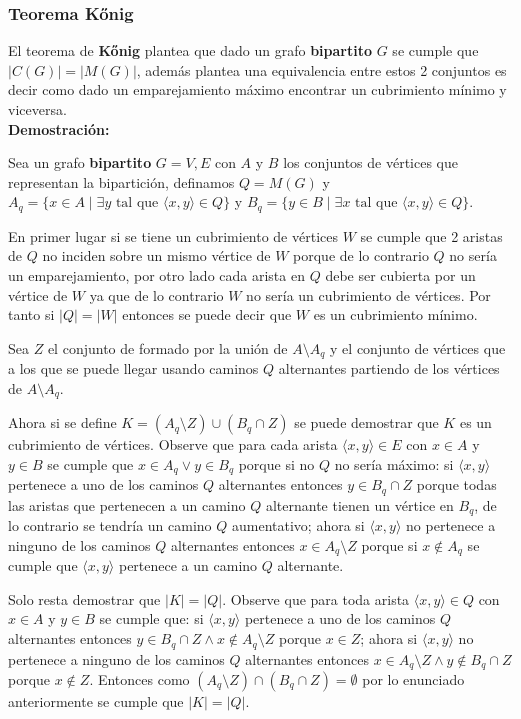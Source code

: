 \documentclass{article}
\begin{document}
\subsubsection{Teorema Kőnig}

El teorema de \textbf{Kőnig} plantea que dado un grafo \textbf{bipartito} $G$ se cumple que $|C(G)|=|M(G)|$, además plantea una equivalencia
entre estos 2 conjuntos es decir como dado un emparejamiento máximo encontrar un cubrimiento mínimo y viceversa.\\

\textbf{Demostración:}

Sea un grafo \textbf{bipartito} $G=V,E$ con $A$ y $B$ los conjuntos de vértices que representan la bipartición, definamos $Q = M(G)$ y
$A_q = \{ x \in A \mid \exists y \text{ tal que } \langle x, y \rangle \in Q \}$
y $B_q = \{ y \in B \mid \exists x \text{ tal que } \langle x, y \rangle \in Q \}$.

En primer lugar si se tiene un cubrimiento de vértices $W$ se cumple que 2 aristas de $Q$ no inciden
sobre un mismo vértice de $W$ porque de lo contrario $Q$ no sería un emparejamiento, por otro lado cada arista en $Q$ debe ser
cubierta por un vértice de $W$ ya que de lo contrario $W$ no sería un cubrimiento de vértices. Por tanto si $|Q|=|W|$ entonces se puede
decir que $W$ es un cubrimiento mínimo.

Sea $Z$ el conjunto de formado por la unión de $A \setminus A_q$ y el conjunto de vértices que a los que se puede llegar usando
caminos $Q$ alternantes partiendo de los vértices de $A \setminus A_q$.

Ahora si se define $K = (A_q\setminus Z) \cup (B_q \cap Z)$ se puede demostrar que $K$ es un cubrimiento de vértices. Observe que
para cada arista $\langle x, y \rangle \in E$ con $x\in A$ y $y\in B$ se cumple que $x \in A_q \vee y \in B_q$ porque si no $Q$
no sería máximo: si $\langle x, y \rangle$ pertenece a uno de los caminos $Q$ alternantes entonces $y \in B_q \cap Z$ porque todas las aristas
que pertenecen a un camino $Q$ alternante tienen un vértice en $B_q$, de lo contrario se tendría un camino $Q$ aumentativo; ahora si $\langle x, y \rangle$
no pertenece a ninguno de los caminos $Q$ alternantes entonces $x \in A_q\setminus Z$ porque si $x \notin A_q$ se cumple que $\langle x, y \rangle$
pertenece a un camino $Q$ alternante.

Solo resta demostrar que $|K|=|Q|$. Observe que para toda arista $\langle x, y \rangle \in Q$ con $x\in A$ y $y\in B$
se cumple que: si $\langle x, y \rangle$ pertenece a uno de los caminos $Q$ alternantes entonces $y \in B_q \cap Z \wedge x \notin A_q\setminus Z$ porque $x\in Z$;
ahora si $\langle x, y \rangle$ no pertenece a ninguno de los caminos $Q$ alternantes entonces $x \in A_q\setminus Z \wedge y \notin B_q \cap Z$ porque $x \notin Z$.
Entonces como $(A_q\setminus Z) \cap (B_q \cap Z)= \emptyset$ por lo enunciado anteriormente se cumple que $|K|=|Q|$.
\end{document}

